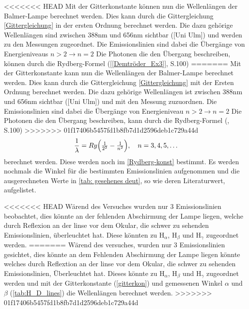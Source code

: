 <<<<<<< HEAD
Mit der Gitterkonstante können nun die Wellenlängen der Balmer-Lampe berechnet werden. 
Dies kann durch die Gittergleichung \ref{Gittergleichung} in der ersten Ordnung berechnet werden.
Die dazu gehörige Wellenlängen sind zwischen 388nm und 656nm sichtbar ([Uni Ulm]) und werden zu den Messungen zugeordnet.
Die Emissionslinien sind dabei die Übergänge von Energieniveaus $n > 2 \xrightarrow{} n = 2$ 
Die Photonen die den Übergang beschreiben, können durch die Rydberg-Formel (\cref{[Demtröder_Ex3]}, S.100) 
=======
Mit der Gitterkonstante kann nun die Wellenlängen der Balmer-Lampe berechnet werden. 
Dies kann durch die Gittergleichung \ref{Gittergleichung} mit der Ersten Ordnung berechnet werden.
Die dazu gehörige Wellenlängen ist zwischen 388nm und 656nm sichtbar ([Uni Ulm]) und mit den Messung zuzuordnen.
Die Emissionslinien sind dabei die Übergänge von Energieniveau $n > 2 \xrightarrow{} n = 2$ 
Die Photonen die den Übergang beschreiben, kann durch die Rydberg-Formel (\cite{Demtröder_Ex3}, S.100) 
>>>>>>> 01f17406b5457fd1b8fb7d1d2596deb1c729a44d
\begin{equation}
  \frac{1}{\lambda}
  = Ry\Bigl(\tfrac{1}{2^{2}} - \tfrac{1}{n^{2}}\Bigr),
  \quad n=3,4,5,\dots
  \label{Rydberg-Formel}
\end{equation}
berechnet werden.
Diese werden noch im \cref{Rydberg-konst} bestimmt. 
Es werden nochmals die Winkel für die bestimmten Emissionslinien aufgenommen und die ausgerechneten Werte in \cref{tab: gesehenes deut}, so wie deren Literaturwert, aufgelistet. 

<<<<<<< HEAD
Wärend des Versuches wurden nur 3 Emissionslinien beobachtet, dies könnte an der fehlenden Abschirmung der Lampe liegen, welche durch Reflexion an der linse vor dem Okular, die schwer zu sehenden Emissionslinien, überleuchtet hat. %
Diese könnten zu H$_\alpha$, H$_\beta$ und H$_\gamma$ zugeordnet werden.
=======
Wärend des versuches, wurden nur 3 Emissionslinien gesichtet, dies könnte an dem Fehlenden Abschirmung der Lampe liegen könnte welches durch Reflextion an der linse vor dem Okular, die schwer zu sehenden Emissionslinien, Überleuchtet hat. %
Dieses könnte zu H$_\alpha$, H$_\beta$ und H$_\gamma$ zugeordnet werden und mit der Gitterkonstante (\cref{gitterkon}) und gemessenen Winkel $\alpha$ und $\beta$ (\cref{tab:H_D_lines}) die Wellenlängen berechnet werden.
>>>>>>> 01f17406b5457fd1b8fb7d1d2596deb1c729a44d


